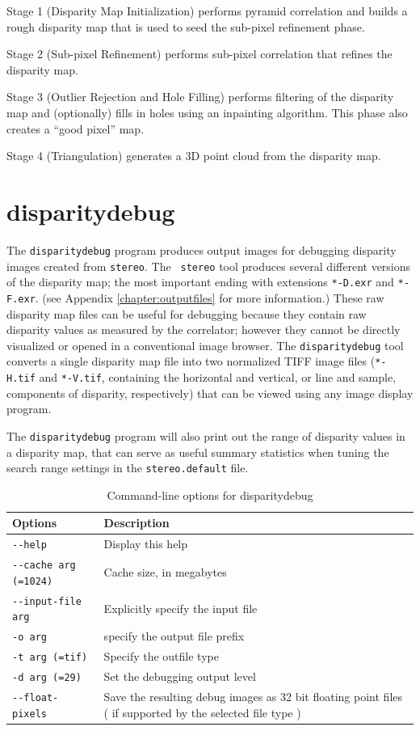 Stage 1 (Disparity Map Initialization) performs pyramid correlation and builds a rough disparity map that is used to seed the sub-pixel refinement phase.

Stage 2 (Sub-pixel Refinement) performs sub-pixel correlation that
refines the disparity map.

Stage 3 (Outlier Rejection and Hole Filling) performs filtering of the
disparity map and (optionally) fills in holes using an inpainting
algorithm.  This phase also creates a ``good pixel'' map.

Stage 4 (Triangulation) generates a 3D point cloud from the disparity
map.

\section{disparitydebug}
\label{disparitydebug}

The \texttt{disparitydebug} program produces output images for
debugging disparity images created from \verb#stereo#. The {\tt
stereo} tool produces several different versions of the disparity
map; the most important ending with extensions \verb#*-D.exr# and
\verb#*-F.exr#. (see Appendix \ref{chapter:outputfiles} for more
information.)  These raw disparity map files can be useful for
debugging because they contain raw disparity values as measured by
the correlator; however they cannot be directly visualized or opened
in a conventional image browser.  The \verb#disparitydebug# tool
converts a single disparity map file into two normalized TIFF image
files (\verb#*-H.tif# and \verb#*-V.tif#, containing the horizontal
and vertical, or line and sample, components of disparity, respectively)
that can be viewed using any image display program.

The {\tt disparitydebug} program will also print out the range of
disparity values in a disparity map, that can serve as useful summary
statistics when tuning the search range settings in the
{\tt stereo.default} file.

\begin{longtable}{|l|p{10cm}|}
\caption{Command-line options for disparitydebug}
\label{tbl:disparitydebug}
\endfirsthead
\endhead
\endfoot
\endlastfoot
\hline
Options & Description \\ \hline \hline
\verb#--help# & Display this help\\ \hline
\verb#--cache arg (=1024)# & Cache size, in megabytes \\ \hline
\verb#--input-file arg# & Explicitly specify the input file \\ \hline
\verb#-o arg# & specify the output file prefix \\ \hline
\verb#-t arg (=tif)# & Specify the outfile type \\ \hline
\verb#-d arg (=29)# & Set the debugging output level \\ \hline
\verb#--float-pixels# & Save the resulting debug images as 32 bit floating point files ( if supported by the selected file type ) \\ \hline
\end{longtable}

